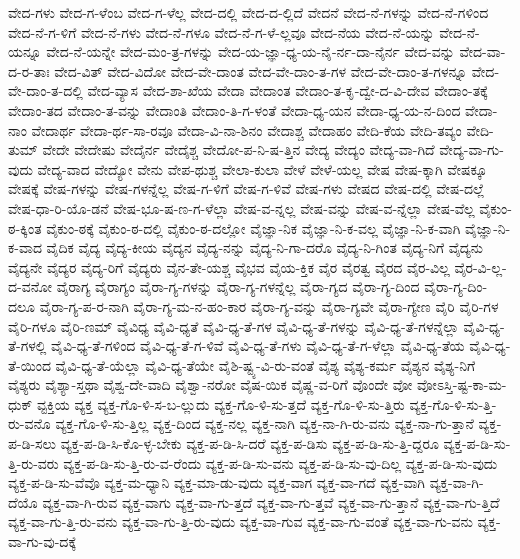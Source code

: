 {ವೇದ-ಗಳು
ವೇದ-ಗ-ಳೆಂಬ
ವೇದ-ಗ-ಳೆಲ್ಲ
ವೇದ-ದಲ್ಲಿ
ವೇದ-ದ-ಲ್ಲಿದೆ
ವೇದನೆ
ವೇದ-ನೆ-ಗಳನ್ನು
ವೇದ-ನೆ-ಗಳಿಂದ
ವೇದ-ನೆ-ಗ-ಳಿಗೆ
ವೇದ-ನೆ-ಗಳು
ವೇದ-ನೆ-ಗಳೂ
ವೇದ-ನೆ-ಗ-ಳೆ-ಲ್ಲವೂ
ವೇದ-ನೆಯ
ವೇದ-ನೆ-ಯನ್ನು
ವೇದ-ನೆ-ಯನ್ನೂ
ವೇದ-ನೆ-ಯನ್ನೇ
ವೇದ-ಮಂ-ತ್ರ-ಗಳನ್ನು
ವೇದ-ಯ-ಜ್ಞಾ-ಧ್ಯ-ಯ-ನೈ-ರ್ನ-ದಾ-ನೈರ್ನ
ವೇದ-ವನ್ನು
ವೇದ-ವಾ-ದ-ರ-ತಾಃ
ವೇದ-ವಿತ್
ವೇದ-ವಿದೋ
ವೇದ-ವೇ-ದಾಂತ
ವೇದ-ವೇ-ದಾಂ-ತ-ಗಳ
ವೇದ-ವೇ-ದಾಂ-ತ-ಗಳನ್ನೂ
ವೇದ-ವೇ-ದಾಂ-ತ-ದಲ್ಲಿ
ವೇದ-ವ್ಯಾಸ
ವೇದ-ಶಾ-ಖೆಯ
ವೇದಾ
ವೇದಾಂತ
ವೇದಾಂ-ತ-ಕೃ-ದ್ವೇ-ದ-ವಿ-ದೇವ
ವೇದಾಂ-ತಕ್ಕೆ
ವೇದಾಂ-ತದ
ವೇದಾಂ-ತ-ವನ್ನು
ವೇದಾಂತಿ
ವೇದಾಂ-ತಿ-ಗ-ಳಂತೆ
ವೇದಾ-ಧ್ಯ-ಯನ
ವೇದಾ-ಧ್ಯ-ಯ-ನ-ದಿಂದ
ವೇದಾ-ನಾಂ
ವೇದಾರ್ಥ
ವೇದಾ-ರ್ಥ-ಸಾ-ರವೂ
ವೇದಾ-ವಿ-ನಾ-ಶಿನಂ
ವೇದಾಶ್ಚ
ವೇದಾಹಂ
ವೇದಿ-ಕೆಯ
ವೇದಿ-ತವ್ಯಂ
ವೇದಿ-ತುಮ್
ವೇದೇ
ವೇದೇಷು
ವೇದೈರ್ನ
ವೇದೈಶ್ಚ
ವೇದೋ-ಪ-ನಿ-ಷ-ತ್ತಿನ
ವೇದ್ಯ
ವೇದ್ಯಂ
ವೇದ್ಯ-ವಾ-ಗಿದೆ
ವೇದ್ಯ-ವಾ-ಗು-ವುದು
ವೇದ್ಯ-ವಾದ
ವೇದ್ಯೋ
ವೇನು
ವೇಪ-ಥುಶ್ಚ
ವೇಲಾ-ಕುಲಾ
ವೇಳೆ
ವೇಳೆ-ಯಲ್ಲ
ವೇಷ
ವೇಷ-ಕ್ಕಾಗಿ
ವೇಷಕ್ಕೂ
ವೇಷಕ್ಕೆ
ವೇಷ-ಗಳನ್ನು
ವೇಷ-ಗಳನ್ನೆಲ್ಲ
ವೇಷ-ಗ-ಳಿಗೆ
ವೇಷ-ಗ-ಳಿವೆ
ವೇಷ-ಗಳು
ವೇಷದ
ವೇಷ-ದಲ್ಲಿ
ವೇಷ-ದಲ್ಲೆ
ವೇಷ-ಧಾ-ರಿ-ಯೊ-ಡನೆ
ವೇಷ-ಭೂ-ಷ-ಣ-ಗ-ಳೆಲ್ಲಾ
ವೇಷ-ವ-ನ್ನಲ್ಲ
ವೇಷ-ವನ್ನು
ವೇಷ-ವ-ನ್ನೆಲ್ಲಾ
ವೇಷ-ವೆಲ್ಲ
ವೈಕುಂ-ಠ-ಕ್ಕಿಂತ
ವೈಕುಂ-ಠಕ್ಕೆ
ವೈಕುಂ-ಠ-ದಲ್ಲಿ
ವೈಕುಂ-ಠ-ದಲ್ಲೋ
ವೈಜ್ಞಾ-ನಿಕ
ವೈಜ್ಞಾ-ನಿ-ಕ-ವಲ್ಲ
ವೈಜ್ಞಾ-ನಿ-ಕ-ವಾಗಿ
ವೈಜ್ಞಾ-ನಿ-ಕ-ವಾದ
ವೈದಿಕ
ವೈದ್ಯ
ವೈದ್ಯ-ಕೀಯ
ವೈದ್ಯನ
ವೈದ್ಯ-ನನ್ನು
ವೈದ್ಯ-ನಿ-ಗಾ-ದರೊ
ವೈದ್ಯ-ನಿ-ಗಿಂತ
ವೈದ್ಯ-ನಿಗೆ
ವೈದ್ಯನು
ವೈದ್ಯನೇ
ವೈದ್ಯರ
ವೈದ್ಯ-ರಿಗೆ
ವೈದ್ಯರು
ವೈನ-ತೇ-ಯಶ್ಚ
ವೈಭವ
ವೈಯ-ಕ್ತಿಕ
ವೈರ
ವೈರತ್ವ
ವೈರದ
ವೈರ-ವಿಲ್ಲ
ವೈರ-ವಿ-ಲ್ಲ-ದ-ವನೋ
ವೈರಾಗ್ಯ
ವೈರಾಗ್ಯಂ
ವೈರಾ-ಗ್ಯ-ಗಳನ್ನು
ವೈರಾ-ಗ್ಯ-ಗಳನ್ನೆಲ್ಲ
ವೈರಾ-ಗ್ಯದ
ವೈರಾ-ಗ್ಯ-ದಿಂದ
ವೈರಾ-ಗ್ಯ-ದಿಂ-ದಲೂ
ವೈರಾ-ಗ್ಯ-ಪ-ರ-ನಾಗಿ
ವೈರಾ-ಗ್ಯ-ಮ-ನ-ಹಂ-ಕಾರ
ವೈರಾ-ಗ್ಯ-ವನ್ನು
ವೈರಾ-ಗ್ಯವೇ
ವೈರಾ-ಗ್ಯೇಣ
ವೈರಿ
ವೈರಿ-ಗಳ
ವೈರಿ-ಗಳೂ
ವೈರಿ-ಣಮ್
ವೈವಿಧ್ಯ
ವೈವಿ-ಧ್ಯತೆ
ವೈವಿ-ಧ್ಯ-ತೆ-ಗಳ
ವೈವಿ-ಧ್ಯ-ತೆ-ಗಳನ್ನು
ವೈವಿ-ಧ್ಯ-ತೆ-ಗಳನ್ನೆಲ್ಲಾ
ವೈವಿ-ಧ್ಯ-ತೆ-ಗಳಲ್ಲಿ
ವೈವಿ-ಧ್ಯ-ತೆ-ಗಳಿಂದ
ವೈವಿ-ಧ್ಯ-ತೆ-ಗ-ಳಿವೆ
ವೈವಿ-ಧ್ಯ-ತೆ-ಗಳು
ವೈವಿ-ಧ್ಯ-ತೆ-ಗ-ಳೆಲ್ಲಾ
ವೈವಿ-ಧ್ಯ-ತೆಯ
ವೈವಿ-ಧ್ಯ-ತೆ-ಯಿಂದ
ವೈವಿ-ಧ್ಯ-ತೆ-ಯೆಲ್ಲಾ
ವೈವಿ-ಧ್ಯ-ತೆಯೇ
ವೈಶಿ-ಷ್ಟ್ಯ-ವಿ-ರು-ವಂತೆ
ವೈಶ್ಯ
ವೈಶ್ಯ-ಕರ್ಮ
ವೈಶ್ಯನ
ವೈಶ್ಯ-ನಿಗೆ
ವೈಶ್ಯರು
ವೈಶ್ಯಾ-ಸ್ತಥಾ
ವೈಶ್ವ-ದೇ-ವಾದಿ
ವೈಶ್ವಾ-ನರೋ
ವೈಷ-ಯಿಕ
ವೈಷ್ಣ-ವ-ರಿಗೆ
ವೊಂದೇ
ವೋ
ವೋಽಸ್ತಿ-ಷ್ಟ-ಕಾ-ಮ-ಧುಕ್
ವ್ಟಕ್ತಿಯ
ವ್ಯಕ್ತ
ವ್ಯಕ್ತ-ಗೊ-ಳಿ-ಸ-ಬ-ಲ್ಲುದು
ವ್ಯಕ್ತ-ಗೊ-ಳಿ-ಸು-ತ್ತದೆ
ವ್ಯಕ್ತ-ಗೊ-ಳಿ-ಸು-ತ್ತಿರು
ವ್ಯಕ್ತ-ಗೊ-ಳಿ-ಸು-ತ್ತಿ-ರು-ವನೊ
ವ್ಯಕ್ತ-ಗೊ-ಳಿ-ಸು-ತ್ತಿಲ್ಲ
ವ್ಯಕ್ತ-ದಿಂದ
ವ್ಯಕ್ತ-ನಲ್ಲ
ವ್ಯಕ್ತ-ನಾಗಿ
ವ್ಯಕ್ತ-ನಾ-ಗಿ-ರು-ವನು
ವ್ಯಕ್ತ-ನಾ-ಗು-ತ್ತಾನೆ
ವ್ಯಕ್ತ-ಪ-ಡಿ-ಸಲು
ವ್ಯಕ್ತ-ಪ-ಡಿ-ಸಿ-ಕೊ-ಳ್ಳ-ಬೇಕು
ವ್ಯಕ್ತ-ಪ-ಡಿ-ಸಿ-ದರೆ
ವ್ಯಕ್ತ-ಪ-ಡಿಸು
ವ್ಯಕ್ತ-ಪ-ಡಿ-ಸು-ತ್ತಿ-ದ್ದರೂ
ವ್ಯಕ್ತ-ಪ-ಡಿ-ಸು-ತ್ತಿ-ರು-ವರು
ವ್ಯಕ್ತ-ಪ-ಡಿ-ಸು-ತ್ತಿ-ರು-ವ-ರೆಂದು
ವ್ಯಕ್ತ-ಪ-ಡಿ-ಸು-ವನು
ವ್ಯಕ್ತ-ಪ-ಡಿ-ಸು-ವು-ದಿಲ್ಲ
ವ್ಯಕ್ತ-ಪ-ಡಿ-ಸು-ವುದು
ವ್ಯಕ್ತ-ಪ-ಡಿ-ಸು-ವೆವೊ
ವ್ಯಕ್ತ-ಮ-ಧ್ಯಾನಿ
ವ್ಯಕ್ತ-ಮಾ-ಡು-ವುದು
ವ್ಯಕ್ತ-ವಾಗ
ವ್ಯಕ್ತ-ವಾ-ಗದೆ
ವ್ಯಕ್ತ-ವಾಗಿ
ವ್ಯಕ್ತ-ವಾ-ಗಿ-ದೆಯೊ
ವ್ಯಕ್ತ-ವಾ-ಗಿ-ರುವ
ವ್ಯಕ್ತ-ವಾಗು
ವ್ಯಕ್ತ-ವಾ-ಗು-ತ್ತದೆ
ವ್ಯಕ್ತ-ವಾ-ಗು-ತ್ತವೆ
ವ್ಯಕ್ತ-ವಾ-ಗು-ತ್ತಾನೆ
ವ್ಯಕ್ತ-ವಾ-ಗು-ತ್ತಿದೆ
ವ್ಯಕ್ತ-ವಾ-ಗು-ತ್ತಿ-ರು-ವನು
ವ್ಯಕ್ತ-ವಾ-ಗು-ತ್ತಿ-ರು-ವುದು
ವ್ಯಕ್ತ-ವಾ-ಗುವ
ವ್ಯಕ್ತ-ವಾ-ಗು-ವಂತೆ
ವ್ಯಕ್ತ-ವಾ-ಗು-ವನು
ವ್ಯಕ್ತ-ವಾ-ಗು-ವು-ದಕ್ಕೆ
}

